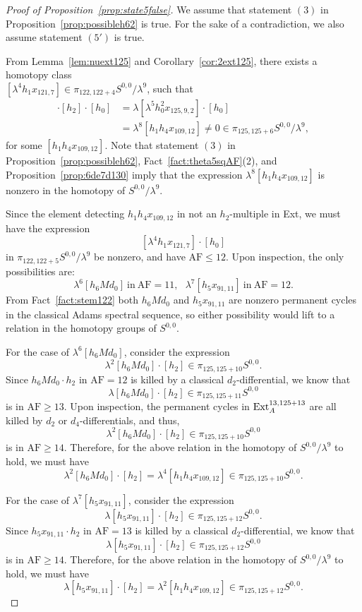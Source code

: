 \documentclass{amsart}
\numberwithin{equation}{section}
\newcommand{\AF}{\mathrm{AF}}
\begin{document}
\begin{proof}[Proof of Proposition~\ref{prop:state5false}]
    We assume that statement $(3)$ in Proposition~\ref{prop:possibleh62} is true. For the sake of a contradiction, we also assume statement $(5')$ is true.

    From Lemma~\ref{lem:nuext125} and Corollary~\ref{cor:2ext125}, there exists a homotopy class\\ $[\lambda^4 h_1 x_{121,7}] \in \pi_{122,122+4}S^{0,0}/\lambda^9$, such that
\begin{align*}
    [\lambda^4 h_1 x_{121,7}] \cdot [h_2] \cdot [h_0] & = \lambda [\lambda^5 h_0^2 x_{125,9,2}] \cdot [h_0] \\
    & = \lambda^8 [h_1h_4x_{109,12}] \neq 0 \in \pi_{125,125+6} S^{0,0}/\lambda^9,
\end{align*} 
    for some $[h_1h_4x_{109,12}]$. Note that statement $(3)$ in Proposition~\ref{prop:possibleh62}, Fact~\ref{fact:theta5sqAF}(2), and Proposition~\ref{prop:6de7d130} imply that the expression  $\lambda^8 [h_1h_4x_{109,12}]$ is nonzero in the homotopy of $S^{0,0}/\lambda^9$.

Since the element detecting $h_1h_4x_{109,12}$ in not an $h_2$-multiple in Ext, we must have the expression
$$[\lambda^4 h_1 x_{121,7}] \cdot [h_0]$$
in $\pi_{122,122+5} S^{0,0}/\lambda^9$ be nonzero, and have $\AF \le 12$. Upon inspection, the only possibilities are:
$$\lambda^6 [h_6 M d_0] \ \text{in} \ \AF=11,  \ \ \ \lambda^7 [h_5x_{91,11}] \ \text{in} \ \AF=12.$$
From Fact~\ref{fact:stem122} both $h_6 M d_0$ and $h_5x_{91,11}$ are nonzero permanent cycles in the classical Adams spectral sequence, so either possibility would lift to a relation in the homotopy groups of $S^{0,0}$.

For the case of $\lambda^6 [h_6 M d_0]$, consider the expression
$$\lambda^2 [h_6 M d_0] \cdot [h_2] \in \pi_{125, 125+10}S^{0,0}.$$
Since $h_6 M d_0 \cdot h_2$ in $\AF=12$ is killed by a classical $d_2$-differential, we know that 
$$\lambda [h_6 M d_0] \cdot [h_2] \in \pi_{125, 125+11}S^{0,0}$$ 
is in $\AF \ge 13$. Upon inspection, the permanent cycles in $\mathrm{Ext}_A^{13, 125+13}$ are all killed by $d_2$ or $d_4$-differentials, and thus, $$\lambda^2 [h_6 M d_0] \cdot [h_2] \in \pi_{125, 125+10}S^{0,0}$$ 
is in $\AF \ge 14$. Therefore, for the above relation in the homotopy of $S^{0,0}/\lambda^9$ to hold, we must have 
$$\lambda^2 [h_6 M d_0] \cdot [h_2] = \lambda^4 [h_1h_4x_{109,12}] \in \pi_{125, 125+10} S^{0,0}.$$

For the case of $\lambda^7 [h_5x_{91,11}]$, consider the expression
$$\lambda [h_5x_{91,11}] \cdot [h_2] \in \pi_{125, 125+12}S^{0,0}.$$
Since $h_5x_{91,11} \cdot h_2$ in $\AF=13$ is killed by a classical $d_2$-differential, we know that
$$\lambda [h_5x_{91,11}] \cdot [h_2] \in \pi_{125, 125+12}S^{0,0}$$
is in $\AF \ge 14$.
Therefore, for the above relation in the homotopy of $S^{0,0}/\lambda^9$ to hold, we must have
$$\lambda [h_5x_{91,11}] \cdot [h_2] = \lambda^2 [h_1h_4x_{109,12}] \in \pi_{125, 125+12}S^{0,0}.$$


\end{proof}
\end{document}
